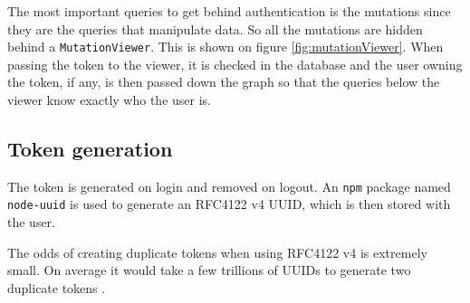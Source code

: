 The most important queries to get behind authentication is the mutations since they are the queries that manipulate data. 
So all the mutations are hidden behind a \verb+MutationViewer+. 
This is shown on figure \ref{fig:mutationViewer}. 
When passing the token to the viewer, it is checked in the database and the user owning the token, if any, is then passed down the graph so that the queries below the viewer know exactly who the user is. 


\subsection{Token generation}
The token is generated on login and removed on logout. 
An \verb+npm+ package named \verb+node-uuid+ is used to generate an RFC4122 v4 UUID, which is then stored with the user. 

The odds of creating duplicate tokens when using RFC4122 v4 is extremely small. 
On average it would take a few trillions of UUIDs to generate two duplicate tokens \citep{authentication:uuid}.
